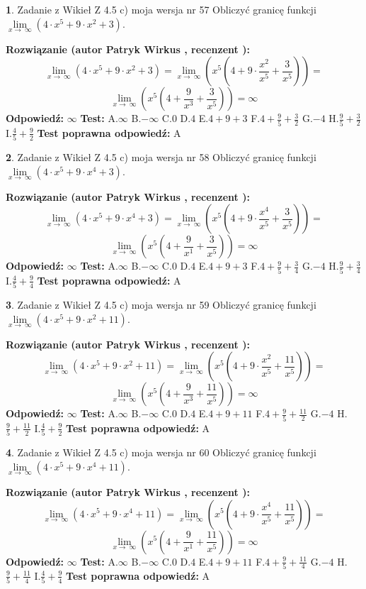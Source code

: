 \documentclass[12pt, a4paper]{article}
\theoremstyle{definition} %
\newtheorem{zad}{}
\newcommand{\zadStart}[1]{\begin{zad}#1\newline}
\newcommand{\zadStop}{\end{zad}}
\newcommand{\rozwStart}[2]{\noindent \textbf{Rozwiązanie (autor #1 , recenzent #2): }\newline}
\newcommand{\rozwStop}{\newline}
\newcommand{\odpStart}{\noindent \textbf{Odpowiedź:}\newline}
\newcommand{\odpStop}{\newline}
\newcommand{\testStart}{\noindent \textbf{Test:}\newline}
\newcommand{\testStop}{\newline}
\newcommand{\kluczStart}{\noindent \textbf{Test poprawna odpowiedź:}\newline}
\newcommand{\kluczStop}{\newline}
\begin{document}
\zadStart{Zadanie z Wikieł Z 4.5 c) moja wersja nr 57}
Obliczyć granicę funkcji  $\lim\limits_{x\to\ \infty}(4 \cdot x^{5}+9 \cdot x^{2}+3)$.
\zadStop
\rozwStart{Patryk Wirkus}{}
$$\lim\limits_{x\to\ \infty}(4 \cdot x^{5}+9 \cdot x^{2}+3) = \lim\limits_{x\to\ \infty}(x^{5}(4 +9 \cdot \frac{x^{2}}{x^{5}}+\frac{3}{x^{5}})) =$$ $$\lim\limits_{x\to\ \infty}(x^{5}(4 +\frac{9}{x^{3}}+\frac{3}{x^{5}})) =\infty$$
\rozwStop
\odpStart
$\infty$
\odpStop
\testStart
A.$\infty$ B.$-\infty$ C.$0$ D.$4$ E.$4 + 9 + 3$
F.$4+\frac{9}{5}+\frac{3}{2}$ G.$-4$
H.$\frac{9}{5}+\frac{3}{2}$
I.$\frac{4}{5}+\frac{9}{2}$
\testStop
\kluczStart
A
\kluczStop



\zadStart{Zadanie z Wikieł Z 4.5 c) moja wersja nr 58}
Obliczyć granicę funkcji  $\lim\limits_{x\to\ \infty}(4 \cdot x^{5}+9 \cdot x^{4}+3)$.
\zadStop
\rozwStart{Patryk Wirkus}{}
$$\lim\limits_{x\to\ \infty}(4 \cdot x^{5}+9 \cdot x^{4}+3) = \lim\limits_{x\to\ \infty}(x^{5}(4 +9 \cdot \frac{x^{4}}{x^{5}}+\frac{3}{x^{5}})) =$$ $$\lim\limits_{x\to\ \infty}(x^{5}(4 +\frac{9}{x^{1}}+\frac{3}{x^{5}})) =\infty$$
\rozwStop
\odpStart
$\infty$
\odpStop
\testStart
A.$\infty$ B.$-\infty$ C.$0$ D.$4$ E.$4 + 9 + 3$
F.$4+\frac{9}{5}+\frac{3}{4}$ G.$-4$
H.$\frac{9}{5}+\frac{3}{4}$
I.$\frac{4}{5}+\frac{9}{4}$
\testStop
\kluczStart
A
\kluczStop



\zadStart{Zadanie z Wikieł Z 4.5 c) moja wersja nr 59}
Obliczyć granicę funkcji  $\lim\limits_{x\to\ \infty}(4 \cdot x^{5}+9 \cdot x^{2}+11)$.
\zadStop
\rozwStart{Patryk Wirkus}{}
$$\lim\limits_{x\to\ \infty}(4 \cdot x^{5}+9 \cdot x^{2}+11) = \lim\limits_{x\to\ \infty}(x^{5}(4 +9 \cdot \frac{x^{2}}{x^{5}}+\frac{11}{x^{5}})) =$$ $$\lim\limits_{x\to\ \infty}(x^{5}(4 +\frac{9}{x^{3}}+\frac{11}{x^{5}})) =\infty$$
\rozwStop
\odpStart
$\infty$
\odpStop
\testStart
A.$\infty$ B.$-\infty$ C.$0$ D.$4$ E.$4 + 9 + 11$
F.$4+\frac{9}{5}+\frac{11}{2}$ G.$-4$
H.$\frac{9}{5}+\frac{11}{2}$
I.$\frac{4}{5}+\frac{9}{2}$
\testStop
\kluczStart
A
\kluczStop



\zadStart{Zadanie z Wikieł Z 4.5 c) moja wersja nr 60}
Obliczyć granicę funkcji  $\lim\limits_{x\to\ \infty}(4 \cdot x^{5}+9 \cdot x^{4}+11)$.
\zadStop
\rozwStart{Patryk Wirkus}{}
$$\lim\limits_{x\to\ \infty}(4 \cdot x^{5}+9 \cdot x^{4}+11) = \lim\limits_{x\to\ \infty}(x^{5}(4 +9 \cdot \frac{x^{4}}{x^{5}}+\frac{11}{x^{5}})) =$$ $$\lim\limits_{x\to\ \infty}(x^{5}(4 +\frac{9}{x^{1}}+\frac{11}{x^{5}})) =\infty$$
\rozwStop
\odpStart
$\infty$
\odpStop
\testStart
A.$\infty$ B.$-\infty$ C.$0$ D.$4$ E.$4 + 9 + 11$
F.$4+\frac{9}{5}+\frac{11}{4}$ G.$-4$
H.$\frac{9}{5}+\frac{11}{4}$
I.$\frac{4}{5}+\frac{9}{4}$
\testStop
\kluczStart
A
\kluczStop
\end{document}
